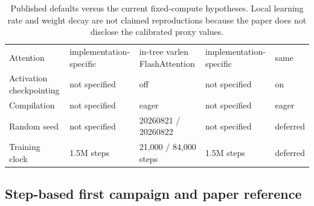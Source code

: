 \documentclass{article}
\begin{document}
\begin{table}[H]
\begin{tabularx}{\textwidth}{@{}p{}YYYY@{}}
    Attention & implementation-specific & in-tree varlen FlashAttention & implementation-specific & same \\
    Activation checkpointing & not specified & off & not specified & on \\
    Compilation & not specified & eager & not specified & eager \\
    Random seed & not specified & 20260821 / 20260822 & not specified & deferred \\
    Training clock & 1.5M steps & 21,000 / 84,000 steps & 1.5M steps & deferred \\
    \bottomrule
  \end{tabularx}
  \caption{Published defaults versus the current fixed-compute hypotheses. Local learning rate and weight decay are not claimed reproductions because the paper does not disclose the calibrated proxy values.}
  \label{tab:optimization}
\end{table}

\subsection{Step-based first campaign and paper reference}

\begin{table}[H]
  \centering
  \scriptsize
  \setlength{\tabcolsep}{3.5pt}
  \caption{Optimizer-step accounting on four GPUs. Warmup is exactly 10\% of each local target: 2,100 and 8,400 steps. Configured source weights sum to 101 and are normalized to 35.64/10.89/53.47\%.}
  \label{tab:stages}
\end{table}
\end{document}
